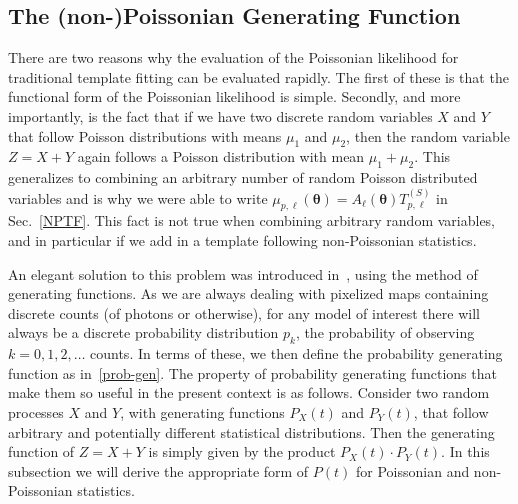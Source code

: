 \subsection{The (non-)Poissonian Generating Function}

There are two reasons why the evaluation of the Poissonian likelihood for traditional template fitting can be evaluated rapidly. The first of these is that the functional form of the Poissonian likelihood is simple. Secondly, and more importantly, is the fact that if we have two discrete random variables $X$ and $Y$ that follow Poisson distributions with means $\mu_1$ and $\mu_2$, then the random variable $Z = X + Y$ again follows a Poisson distribution with mean $\mu_1 + \mu_2$. This generalizes to combining an arbitrary number of random Poisson distributed variables and is why we were able to write $\mu_{p,\ell}(\bm{\theta}) = A_{\ell}(\bm{\theta})T_{p,\ell}^{(S)}$ in Sec.~\ref{NPTF}. This fact is not true when combining arbitrary random variables, and in particular if we add in a template following non-Poissonian statistics. 

An elegant solution to this problem was introduced in~\cite{Malyshev:2011zi}, using the method of generating functions. As we are always dealing with pixelized maps containing discrete counts (of photons or otherwise), for any model of interest there will always be a discrete probability distribution $p_k$, the probability of observing $k=0, 1, 2, \ldots$ counts. In terms of these, we then define the probability generating function as in~\eqref{prob-gen}. The property of probability generating functions that make them so useful in the present context is as follows. Consider two random processes $X$ and $Y$, with generating functions $P_X(t)$ and $P_Y(t)$, that follow arbitrary and potentially different statistical distributions. Then the generating function of $Z = X + Y$ is simply given by the product $P_X(t) \cdot P_Y(t)$. In this subsection we will derive the appropriate form of $P(t)$ for Poissonian and non-Poissonian statistics.

